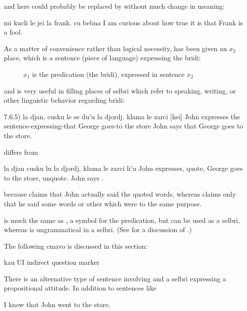 {\noindent}and here  could probably be replaced by  without
    much change in meaning:
\begin{example}
mi kucli le jei la frank. cu bebna \n
I am curious about how true it is\n
\T	that Frank is a fool.
\end{example}

As a matter of convenience rather than logical necessity,
     has been given an $x_2$ place, which is a sentence (piece
    of language) expressing the bridi: 
\begin{description}
\item[] $x_1$ is the predication (the bridi), expressed in sentence $x_2$
\end{description}

and  is very useful in filling places of
    selbri which refer to speaking, writing, or other linguistic
    behavior regarding bridi: 

\label{html:e7d6.5}
7.6.5)  la djan. cusku
        le se du'u
            la djordj. klama le zarci [kei]
    John expresses
        the sentence-expressing-that
            George goes-to the store
    John says that George goes to the store.

 differs from
\begin{example}
la djan cusku\n
\T	lu la djordj. klama le zarci li'u\n
John expresses,\n
\T	quote, George goes to the store, unquote.\n
John says .
\end{example}

{\noindent}because  claims that John
    actually said the quoted words, whereas  claims only that he said some words or other which were
    to the same purpose. 

 is much the same as , a
    symbol for the predication, but  can be used as a
    selbri, whereas  is ungrammatical in a selbri. (See  for a discussion of
    .)



The following cmavo is discussed in this section:

   kau UI  indirect question marker

There is an alternative type of sentence involving  and
    a selbri expressing a propositional attitude. In addition to
    sentences like
\begin{example}
I know that John went to the store.
\end{example}

